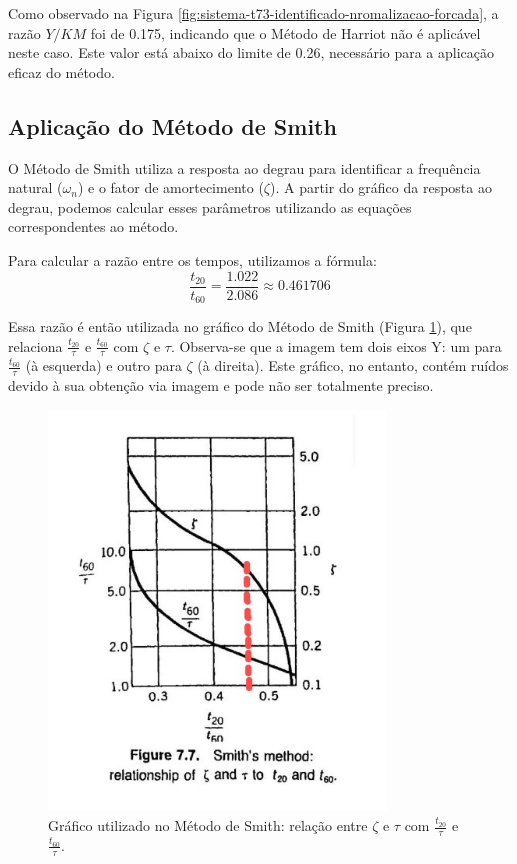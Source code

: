 Como observado na Figura \ref{fig:sistema-t73-identificado-nromalizacao-forcada}, a razão \(Y/KM\) foi de 0.175, indicando que o Método de Harriot não é aplicável neste caso. Este valor está abaixo do limite de 0.26, necessário para a aplicação eficaz do método.

\subsection{Aplicação do Método de Smith}

O Método de Smith utiliza a resposta ao degrau para identificar a frequência natural (\(\omega_n\)) e o fator de amortecimento (\(\zeta\)). A partir do gráfico da resposta ao degrau, podemos calcular esses parâmetros utilizando as equações correspondentes ao método.

Para calcular a razão entre os tempos, utilizamos a fórmula:
\[
    \frac{t_{20}}{t_{60}} = \frac{1.022}{2.086} \approx 0.461706
\]

Essa razão é então utilizada no gráfico do Método de Smith (Figura \ref{fig:analise-smith}), que relaciona \(\frac{t_{20}}{\tau}\) e \(\frac{t_{60}}{\tau}\) com \(\zeta\) e \(\tau\). Observa-se que a imagem tem dois eixos Y: um para \(\frac{t_{60}}{\tau}\) (à esquerda) e outro para \(\zeta\) (à direita). Este gráfico, no entanto, contém ruídos devido à sua obtenção via imagem e pode não ser totalmente preciso.

\begin{figure}[h]
    \centering
    \includegraphics[width=0.8\textwidth]{atividades/10-atividade/assets/analise-smith.png}
    \caption{Gráfico utilizado no Método de Smith: relação entre \(\zeta\) e \(\tau\) com \(\frac{t_{20}}{\tau}\) e \(\frac{t_{60}}{\tau}\).}
    \label{fig:analise-smith}
\end{figure}

